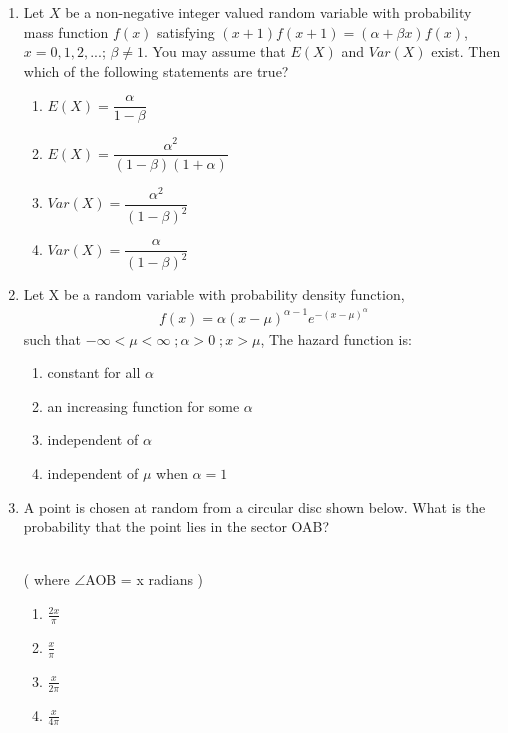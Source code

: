 \renewcommand{\theequation}{\theenumi}
\renewcommand{\thefigure}{\theenumi}
\renewcommand{\thetable}{\theenumi}
\begin{enumerate}[label=\thesection.\arabic*.,ref=\thesection.\theenumi]
%
\item Let $X$ be a non-negative integer valued random variable with probability mass function $f(x)$ satisfying $(x+1)f(x+1)=(\alpha + \beta x)f(x)$, $x=0,1,2,...$; $\beta \neq 1$. You may assume that $E(X)$ and $Var(X)$ exist. Then which of the following statements are true?

\begin{enumerate}
    \item $E(X)=\dfrac{\alpha}{1-\beta}$ \vspace{0.2cm}
    \item $E(X)=\dfrac{\alpha^2}{(1-\beta)(1+\alpha)}$ \vspace{0.2cm}
    \item $Var(X)=\dfrac{\alpha^2}{(1-\beta)^2}$ \vspace{0.2cm}
    \item $Var(X)=\dfrac{\alpha}{(1-\beta)^2}$
\end{enumerate}
%
\solution

%
\item Let X be a random variable with probability density function,
\begin{align}
    f(x)=\alpha(x-\mu)^{\alpha-1}e^{-(x-\mu)^{\alpha}}
\end{align}
such that $-\infty<\mu<\infty\;;\alpha>0\;;x>\mu$, The hazard function is: 
\begin{enumerate}
    \item constant for all $\alpha$
    \item an increasing function for some $\alpha$
    \item independent of $\alpha$
    \item independent of $\mu$ when $\alpha=1$
\end{enumerate}
%
\solution

%
\item 
A point is chosen at random from a circular disc shown below. What is the probability that the point lies in the sector OAB?\\

\\

( where $\angle$AOB = x radians )


    \begin{enumerate}
        \item $\frac{2x}{\pi}$
        \item $\frac{x}{\pi}$
        \item $\frac{x}{2\pi}$
        \item $\frac{x}{4\pi}$
    \end{enumerate}

%
\solution



\end{enumerate}
